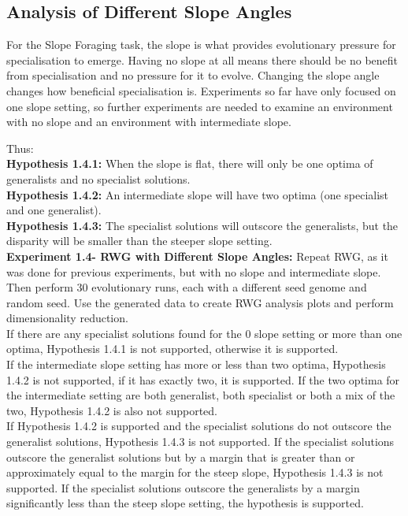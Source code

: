 \documentclass[12pt]{article}
\begin{document}
\subsection{Analysis of Different Slope Angles}

For the Slope Foraging task, the slope is what provides evolutionary pressure for specialisation to emerge.
Having no slope at all means there should be no benefit from specialisation and no pressure for it to evolve.
Changing the slope angle changes how beneficial specialisation is. 
Experiments so far have only focused on one slope setting, so further experiments are needed to examine an environment with no slope and an environment with intermediate slope.

Thus:\\

\textbf{Hypothesis 1.4.1:} When the slope is flat, there will only be one optima of generalists and no specialist solutions.\\

\textbf{Hypothesis 1.4.2:} An intermediate slope will have two optima (one specialist and one generalist).\\

\textbf{Hypothesis 1.4.3:} The specialist solutions will outscore the generalists, but the disparity will be smaller than the steeper slope setting. \\

\textbf{Experiment 1.4- RWG with Different Slope Angles:} Repeat RWG, as it was done for previous experiments, but with no slope and intermediate slope.
Then perform 30 evolutionary runs, each with a different seed genome and random seed.
Use the generated data to create RWG analysis plots and perform dimensionality reduction.\\

If there are any specialist solutions found for the 0 slope setting or more than one optima, Hypothesis 1.4.1 is not supported, otherwise it is supported.\\

If the intermediate slope setting has more or less than two optima, Hypothesis 1.4.2 is not supported, if it has exactly two, it is supported.
If the two optima for the intermediate setting are both generalist, both specialist or both a mix of the two, Hypothesis 1.4.2 is also not supported.\\

If Hypothesis 1.4.2 is supported and the specialist solutions do not outscore the generalist solutions, Hypothesis 1.4.3 is not supported.
If the specialist solutions outscore the generalist solutions but by a margin that is greater than or approximately equal to the margin for the steep slope, Hypothesis 1.4.3 is not supported.
If the specialist solutions outscore the generalists by a margin significantly less than the steep slope setting, the hypothesis is supported.\\
\end{document}

